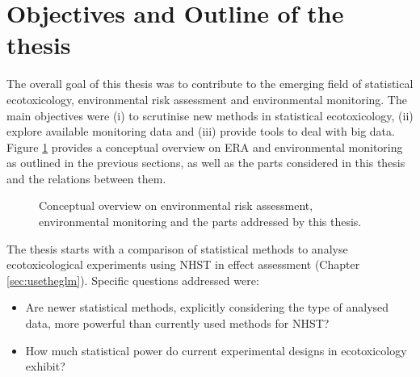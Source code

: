 \newpage
\section{Objectives and Outline of the thesis}

The overall goal of this thesis was to contribute to the emerging field of statistical ecotoxicology, environmental risk assessment and environmental monitoring.
The main objectives were (i) to scrutinise new methods in statistical ecotoxicology,
(ii) explore available monitoring data and
(iii) provide tools to deal with big data.
Figure \ref{fig:intro:overview} provides a conceptual overview on ERA and environmental monitoring as outlined in the previous sections, as well as the parts considered in this thesis and the relations between them. 

\begin{figure}[h]
	\vspace{2em}
    \hspace*{-1cm} 
	\resizebox{1.1\textwidth}{!}{%
		
	}
	\caption[Conceptual overview of the topics addressed by this thesis]{Conceptual overview on environmental risk assessment, environmental monitoring and the parts addressed by this thesis.}
	\label{fig:intro:overview}
\end{figure}

\clearpage
\noindent The thesis starts with a comparison of statistical methods to analyse ecotoxicological experiments using NHST in effect assessment (Chapter \ref{sec:usetheglm}). 
Specific questions addressed were:

\begin{itemize}
	\item Are newer statistical methods, explicitly considering the type of analysed data, more powerful than currently used methods for NHST?
	\item How much statistical power do current experimental designs in ecotoxicology exhibit?
\end{itemize}


